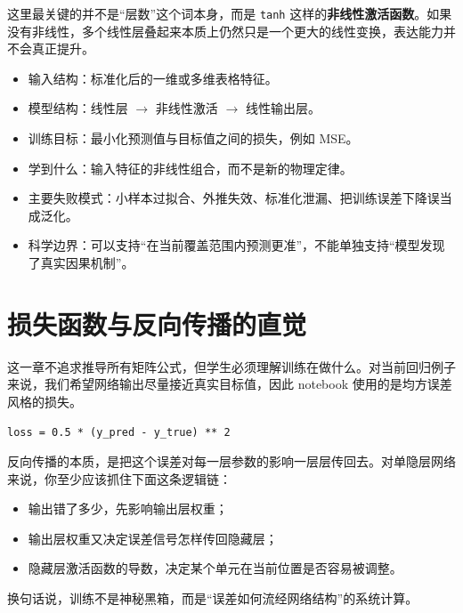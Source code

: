 这里最关键的并不是“层数”这个词本身，而是 \texttt{tanh} 这样的\textbf{非线性激活函数}。如果没有非线性，多个线性层叠起来本质上仍然只是一个更大的线性变换，表达能力并不会真正提升。

\begin{examplebox}
\begin{itemize}
    \item 输入结构：标准化后的一维或多维表格特征。
    \item 模型结构：线性层 $\rightarrow$ 非线性激活 $\rightarrow$ 线性输出层。
    \item 训练目标：最小化预测值与目标值之间的损失，例如 MSE。
    \item 学到什么：输入特征的非线性组合，而不是新的物理定律。
    \item 主要失败模式：小样本过拟合、外推失效、标准化泄漏、把训练误差下降误当成泛化。
    \item 科学边界：可以支持“在当前覆盖范围内预测更准”，不能单独支持“模型发现了真实因果机制”。
\end{itemize}
\end{examplebox}

\section{损失函数与反向传播的直觉}

这一章不追求推导所有矩阵公式，但学生必须理解训练在做什么。对当前回归例子来说，我们希望网络输出尽量接近真实目标值，因此 notebook 使用的是均方误差风格的损失。

\begin{examplebox}[单样本误差的直觉]
\begin{lstlisting}[style=pythonstyle]
loss = 0.5 * (y_pred - y_true) ** 2
\end{lstlisting}
\end{examplebox}

反向传播的本质，是把这个误差对每一层参数的影响一层层传回去。对单隐层网络来说，你至少应该抓住下面这条逻辑链：

\begin{itemize}
    \item 输出错了多少，先影响输出层权重；
    \item 输出层权重又决定误差信号怎样传回隐藏层；
    \item 隐藏层激活函数的导数，决定某个单元在当前位置是否容易被调整。
\end{itemize}

换句话说，训练不是神秘黑箱，而是“误差如何流经网络结构”的系统计算。


